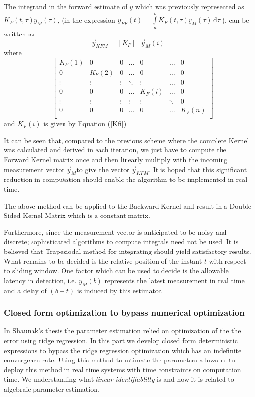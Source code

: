 \documentclass{article}
\begin{document}
The integrand in the forward estimate of $y$ which was previously represented as
$K_F(t,\tau) y_M(\tau)$, 
(in the expression $y_{FE}(t) =\int\limits_{a}^{b}K_F(t,\tau) y_M(\tau)\, \mathrm{d}\tau $ ), 
can be written as 
$$ \vec{y}_{KFM} = [K_F] \textrm{ } \vec{y}_M(i)$$
where 
\begin{equation*}
[K_F] =
\begin{bmatrix}
    K_F(1) &    0   &   0    & \dots  &    0    & \dots  &   0 \\
      0    & K_F(2) &   0    & \dots  &    0    & \dots  &   0 \\
    \vdots & \vdots & \vdots & \ddots & \vdots  & \dots  &   0 \\
      0    &   0    &   0    & \dots  &  K_F(i) & \dots  &   0 \\ 
    \vdots & \vdots & \vdots & \vdots & \vdots  & \ddots &   0 \\
      0    &   0    &   0    & \dots  &    0    & \dots  &   K_F(n) \\
\end{bmatrix}
\end{equation*}
and $K_F(i)$ is given by Equation (\ref{Kfi})

It can be seen that, compared to the previous scheme where the complete Kernel was calculated and derived in each iteration, we just have to compute the Forward Kernel matrix once and then linearly multiply with the incoming measurement vector $\vec{y}_M$to give the vector $\vec{y}_{KFM}$.
It is hoped that this significant reduction in computation should enable the algorithm to be implemented in real time. 

The above method can be applied to the Backward Kernel and result in a Double Sided Kernel Matrix which is a constant matrix.

Furthermore, since the measurement vector is anticipated to be noisy and discrete; sophisticated algorithms to compute integrals need not be used. It is believed that Trapeziodal method for integrating should yield satisfactory results. What remains to be decided is the relative position of the instant $t$ with respect to sliding window. One factor which can be used to decide is the allowable latency in detection, i.e. $y_M(b)$ represents the latest measurement in real time and a delay of $(b-t)$ is induced by this estimator.
 \subsubsection{Closed form optimization to bypass numerical optimization}
In Shaunak's thesis the parameter estimation relied on optimization of the the error using ridge regression. In this part we develop closed form deterministic expressions to bypass the ridge regression optimization which has an indefinite convergence rate. Using this method to estimate the parameters allows us to deploy this method in real time systems with time constraints on computation time. We understanding what \textit{linear identifiablilty} is and how it is related to algebraic parameter estimation.  
\end{document}
